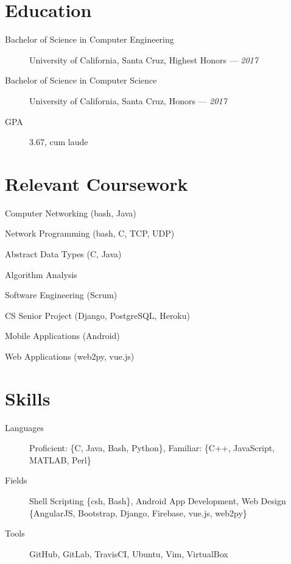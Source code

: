 \documentclass[10pt]{article}
\author{August Valera}
\begin{document}

\section*{Education}
\begin{description}
  \item[Bachelor of Science in Computer Engineering] University of California,
    Santa Cruz, Highest Honors --- \textit{2017}
  \item[Bachelor of Science in Computer Science] University of California, Santa
    Cruz, Honors --- \textit{2017}
  \item[GPA] 3.67, cum laude
\end{description}

\section*{Relevant Coursework}
\begin{itemize}
  \begin{multicols}{2}
  \item Computer Networking (bash, Java) %
  \item Network Programming (bash, C, TCP, UDP) %
  \item Abstract Data Types (C, Java)%
  \item Algorithm Analysis %
  \item Software Engineering (Scrum) %
  \item CS Senior Project (Django, PostgreSQL, Heroku) %
  \item Mobile Applications (Android) %
  \item Web Applications (web2py, vue.js) %
  \end{multicols}
\end{itemize}

\section*{Skills}
\begin{description}
  \item[Languages] Proficient: \{C, Java, Bash, Python\},
    Familiar: \{C++, JavaScript, MATLAB, Perl\}
  \item[Fields] Shell Scripting \{csh, Bash\}, Android App Development, Web
    Design \{AngularJS, Bootstrap, Django, Firebase, vue.js, web2py\}
  \item[Tools] GitHub, GitLab, TravisCI, Ubuntu, Vim, VirtualBox
\end{description}
\end{document}
